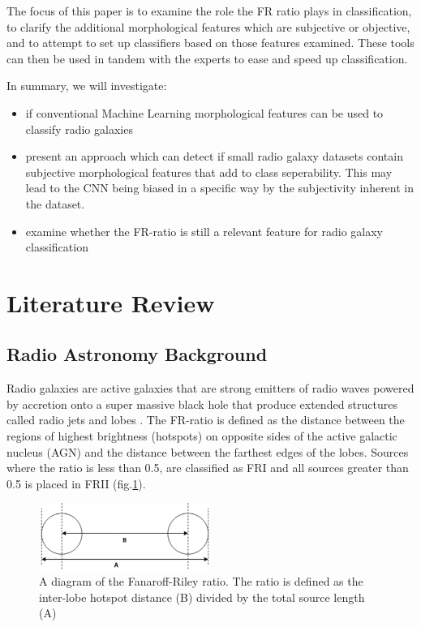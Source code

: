\documentclass[conference]{IEEEtran}
\begin{document}
The focus of this paper is to examine the role the FR ratio plays in 
classification, to clarify the additional morphological features which are subjective or objective, and to attempt to set up classifiers based on those features examined. 
These tools can then be used in tandem with the experts to ease and speed up classification.

In summary, we will investigate:

\begin{itemize}
\item if conventional Machine Learning morphological features can be used to classify radio galaxies
\item present an approach which can detect if small radio galaxy datasets contain subjective morphological features that add to class seperability. This may lead to the CNN being biased in a specific way by the subjectivity inherent in the dataset.
\item examine whether the FR-ratio is still a relevant feature for radio galaxy classification 
\end{itemize}



\section{Literature Review}

\subsection{Radio Astronomy Background}

Radio galaxies are active galaxies that are strong emitters of
radio waves powered by accretion onto a super massive black hole that produce extended structures called radio jets and lobes \cite{wierzbowska_2011}. The FR-ratio is defined as the distance between the regions of highest brightness (hotspots) on opposite sides of the active galactic nucleus (AGN) and the distance between the farthest edges of the lobes. Sources where the ratio is less than 0.5, are classified as FRI and all sources greater than 0.5 is placed in FRII (fig.\ref{fig:becker2019}). 
\begin{figure}[h]
    \centering
    \includegraphics[width=0.5\textwidth]{EPS/ratio_becker.eps}
    \caption{A diagram of the Fanaroff-Riley ratio. The ratio is defined as the inter-lobe hotspot distance (B) divided by the total source length (A)}
    \label{fig:becker2019}
\end{figure}
\end{document}
